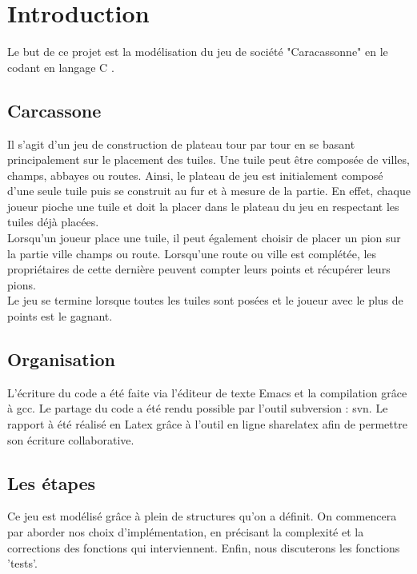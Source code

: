 \section{Introduction}

Le but de ce projet est la modélisation du jeu de société "Caracassonne" en le codant en langage C .

\subsection{Carcassone}

Il s'agit d'un jeu de construction de plateau tour par tour en se basant principalement sur le placement des tuiles. Une tuile peut être composée de villes, champs, abbayes ou routes. Ainsi, le plateau de jeu est initialement composé d'une seule tuile puis se construit au fur et à mesure de la partie. En effet, chaque joueur pioche une tuile et doit la placer dans le plateau du jeu en respectant les tuiles déjà placées.\\
\indent Lorsqu'un joueur place une tuile, il peut également choisir de placer un pion sur la partie ville champs ou route. Lorsqu'une route ou ville est complétée, les propriétaires de cette dernière peuvent compter leurs points et récupérer leurs pions.\\
\indent Le jeu se termine lorsque toutes les tuiles sont posées et le joueur avec le plus de points est le gagnant.\\ 
\subsection {Organisation}
L'écriture du code a été faite via l'éditeur de texte Emacs et la compilation grâce à  gcc. Le partage du code a été rendu possible par l'outil subversion : svn. Le rapport à été réalisé en Latex grâce à l'outil en ligne sharelatex afin de permettre  son écriture collaborative.

\subsection{Les étapes}
Ce jeu est modélisé grâce à plein de structures qu'on a définit. On  commencera par aborder nos choix d'implémentation, en précisant la complexité et la corrections des fonctions qui interviennent. Enfin, nous discuterons les fonctions \textsf{'tests'}.

\newpage

